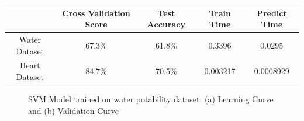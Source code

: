 \documentclass[
	letterpaper, %
]{mlreport}
\begin{document}
\begin{center}
	\begin{tabular}{|c||c|c|c|c|}
	 \hline
	  & Cross Validation Score & Test Accuracy & Train Time & Predict Time \\
	 \hline\hline
	 Water Dataset & 67.3\%  & 61.8\% & 0.3396 & 0.0295 \\
	 \hline
	 Heart Dataset & 84.7\%  & 70.5\% & 0.003217 & 0.0008929\\
	 \hline
	\end{tabular}
	\label{table:table4}
\end{center}
\begin{figure}
	\centering
	\caption{SVM Model trained on water potability dataset. (a) Learning Curve and (b) Validation Curve}
	\label{fig:fig10}
\end{figure}
\end{document}
